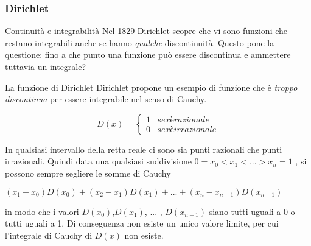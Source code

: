 \begin{frame}[label=Dirichlet]
  \frametitle{Dirichlet}
  \begin{block}{Continuità e integrabilità}    
  Nel 1829 Dirichlet scopre che vi sono funzioni che restano integrabili anche se hanno \textit{qualche} discontinuità.
  Questo pone la questione: fino a che punto una funzione può essere discontinua e ammettere tuttavia un integrale?
  \end{block}  
  \begin{block}{La funzione di Dirichlet}    
    Dirichlet propone un esempio di funzione che è \textit{troppo discontinua} per essere integrabile nel senso di Cauchy.
    
    \begin{equation}
      D(x) =
      \begin{cases*}
        1 & se x è razionale \\
        0 & se x è irrazionale
      \end{cases*}
    \end{equation}

    In qualsiasi intervallo della retta reale ci sono sia punti razionali che punti irrazionali. Quindi data una qualsiasi suddivisione
    $ 0 = x_0 < x_1 < ... > x_n = 1$ , si possono sempre segliere le somme di Cauchy \begin{center}
      $(x_1 - x_0)D(x_0) + (x_2 - x_1)D(x_1) + ... + (x_n - x_{n-1})D(x_{n-1})$
    \end{center}
    in modo che i valori $D(x_0)$,$D(x_1)$, ... , $D(x_{n-1})$ siano tutti uguali a 0 o tutti uguali a 1. Di conseguenza non esiste un 
    unico valore limite, per cui l'integrale di Cauchy di $D(x)$ \alert{non esiste}.
  \end{block}  
  
\end{frame}


